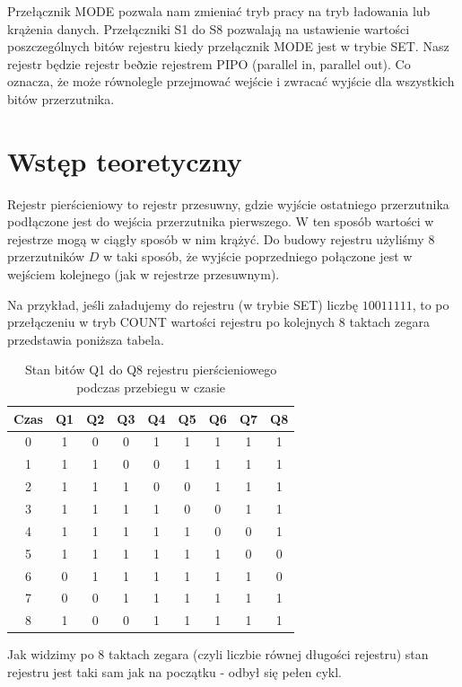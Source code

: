 \documentclass[12pt,a4paper,openright]{mwrep}
\begin{document}
Przełącznik MODE
pozwala nam zmieniać tryb pracy na tryb ładowania lub 
krążenia danych. Przełączniki S1 do S8 pozwalają na ustawienie wartości poszczególnych
bitów rejestru kiedy przełącznik MODE jest w trybie SET.
Nasz rejestr będzie rejestr beðzie rejestrem PIPO (parallel in, parallel out).
Co oznacza, że może równolegle przejmować wejście i zwracać wyjście dla wszystkich
bitów przerzutnika.

\section{Wstęp teoretyczny}

Rejestr pierścieniowy to rejestr przesuwny, gdzie wyjście ostatniego przerzutnika
podłączone jest do wejścia przerzutnika pierwszego. W ten sposób wartości w rejestrze
mogą w ciągły sposób w nim krążyć. Do budowy rejestru użyliśmy 8 przerzutników $D$
w taki sposób, że wyjście poprzedniego połączone jest w wejściem kolejnego 
(jak w rejestrze przesuwnym). 


Na przykład, jeśli załadujemy do rejestru (w trybie SET) liczbę $10011111$, to
po przełączeniu w tryb COUNT wartości rejestru po kolejnych 8 taktach zegara przedstawia poniższa tabela.


\begin{table}[h!]
    \centering
    \begin{tabular}{|c|cccccccc|}
        \hline
        Czas & Q1 & Q2 & Q3 & Q4 & Q5 & Q6 & Q7 & Q8 \\
        \hline
        0 & 1 & 0 & 0 & 1 & 1 & 1 & 1 & 1 \\
        1 & 1 & 1 & 0 & 0 & 1 & 1 & 1 & 1 \\
        2 & 1 & 1 & 1 & 0 & 0 & 1 & 1 & 1 \\
        3 & 1 & 1 & 1 & 1 & 0 & 0 & 1 & 1 \\
        4 & 1 & 1 & 1 & 1 & 1 & 0 & 0 & 1 \\
        5 & 1 & 1 & 1 & 1 & 1 & 1 & 0 & 0 \\
        6 & 0 & 1 & 1 & 1 & 1 & 1 & 1 & 0 \\
        7 & 0 & 0 & 1 & 1 & 1 & 1 & 1 & 1 \\
        8 & 1 & 0 & 0 & 1 & 1 & 1 & 1 & 1 \\
        \hline
    \end{tabular}
    \caption{Stan bitów Q1 do Q8 rejestru pierścieniowego podczas przebiegu w czasie}
\end{table}

Jak widzimy po 8 taktach zegara (czyli liczbie równej długości rejestru) 
stan rejestru jest taki sam jak na początku - odbył się pełen cykl.
\end{document}
